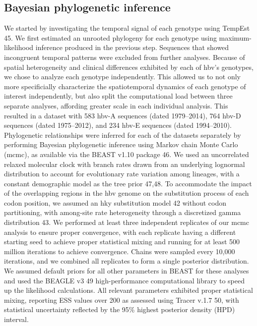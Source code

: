 \subsection{Bayesian phylogenetic inference}
We started by investigating the temporal signal of each genotype using TempEst 45.
We first estimated an unrooted phylogeny for each genotype using maximum-likelihood inference produced in the previous step.
Sequences that showed incongruent temporal patterns were excluded from further analyses.
Because of spatial heterogeneity and clinical differences exhibited by each of \gls{hbv}'s genotypes, we chose to analyze each genotype independently.
This allowed us to not only more specificially characterize the spatiotemporal dynamics of each genotype of interest independently, but also split the computational load between three separate analyses, affording greater scale in each individual analysis.
This resulted in a dataset with 583 \gls{hbv}-A sequences (dated 1979--2014), 764 \gls{hbv}-D sequences (dated 1975--2012), and 234 \gls{hbv}-E sequences (dated 1994--2010).
Phylogenetic relationships were inferred for each of the datasets separately by performing Bayesian phylogenetic inference using Markov chain Monte Carlo (\gls{mcmc}), as available via the BEAST v1.10 package 46.
We used an uncorrelated relaxed molecular clock with branch rates drawn from an underlying lognormal distribution to account for evolutionary rate variation among lineages, with a constant demographic model as the tree prior 47,48.
To accommodate the impact of the overlapping regions in the \gls{hbv} genome on the substitution process of each codon position, we assumed an \gls{hky} substitution model 42 without codon partitioning, with among-site rate heterogeneity through a discretized gamma distribution 43.
We performed at least three independent replicates of our \gls{mcmc} analysis to ensure proper convergence, with each replicate having a different starting seed to achieve proper statistical mixing and running for at least 500 million iterations to achieve convergence.
Chains were sampled every 10,000 iterations, and we combined all replicates to form a single posterior distribution.
We assumed default priors for all other parameters in BEAST for these analyses and used the BEAGLE v3 49 high-performance computational library to speed up the likelihood calculations.
All relevant parameters exhibited proper statistical mixing, reporting ESS values over 200 as assessed using Tracer v.1.7 50, with statistical uncertainty reflected by the 95\% highest posterior density (HPD) interval.\\

